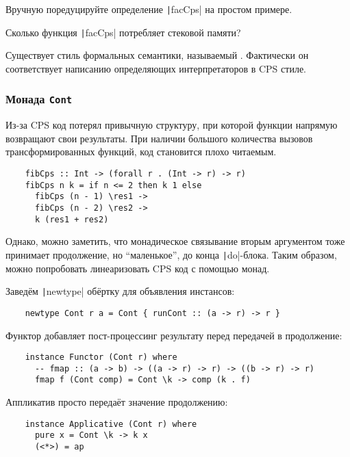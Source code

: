 \begin{task}
    Вручную поредуцируйте определение \texttt|facCps| на простом примере.
\end{task}

\begin{task}
    Сколько функция \texttt|facCps| потребляет стековой памяти?
\end{task}

Существует стиль формальных семантики, называемый .
Фактически он соответствует написанию определяющих интерпретаторов в CPS стиле.

\subsubsection{Монада \texttt{Cont}}

Из-за CPS код потерял привычную структуру, при которой функции напрямую возвращают свои результаты.
При наличии большого количества вызовов трансформированных функций, код становится плохо читаемым.

\begin{verbatim}
    fibCps :: Int -> (forall r . (Int -> r) -> r)
    fibCps n k = if n <= 2 then k 1 else
      fibCps (n - 1) \res1 ->
      fibCps (n - 2) \res2 ->
      k (res1 + res2)
\end{verbatim}

Однако, можно заметить, что монадическое связывание вторым аргументом тоже принимает продолжение, но ``маленькое'', до конца \texttt|do|-блока.
Таким образом, можно попробовать линеаризовать CPS код с помощью монад.

Заведём \texttt|newtype| обёртку для объявления инстансов:
\begin{verbatim}
    newtype Cont r a = Cont { runCont :: (a -> r) -> r }
\end{verbatim}

Функтор добавляет пост-процессинг результату перед передачей в продолжение:
\begin{verbatim}
    instance Functor (Cont r) where
      -- fmap :: (a -> b) -> ((a -> r) -> r) -> ((b -> r) -> r)
      fmap f (Cont comp) = Cont \k -> comp (k . f)
\end{verbatim}

Аппликатив просто передаёт значение продолжению:
\begin{verbatim}
    instance Applicative (Cont r) where
      pure x = Cont \k -> k x
      (<*>) = ap
\end{verbatim}

